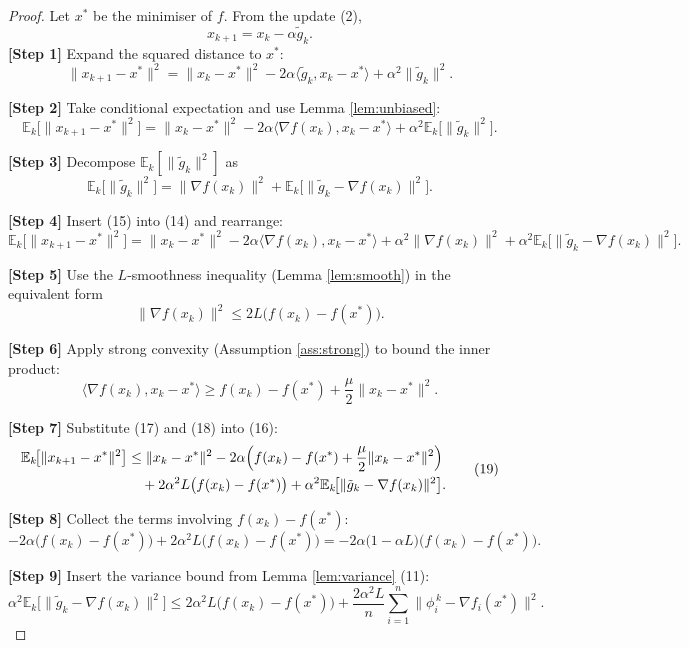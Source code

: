 \documentclass[11pt]{article}
\begin{document}
\begin{proof}
Let $x^*$ be the minimiser of $f$.  From the update (2),
\[
x_{k+1}=x_k-\alpha\tilde g_k .
\tag{12}
\]
\textbf{[Step 1]} Expand the squared distance to $x^*$:
\[
\|x_{k+1}-x^*\|^2
= \|x_k-x^*\|^2-2\alpha\langle\tilde g_k,x_k-x^*\rangle+\alpha^2\|\tilde g_k\|^2 .
\tag{13}
\]

\textbf{[Step 2]} Take conditional expectation and use Lemma \ref{lem:unbiased}:
\[
\mathbb{E}_k\bigl[\|x_{k+1}-x^*\|^2\bigr]
= \|x_k-x^*\|^2-2\alpha\langle\nabla f(x_k),x_k-x^*\rangle
   +\alpha^2\mathbb{E}_k\!\bigl[\|\tilde g_k\|^2\bigr].
\tag{14}
\]

\textbf{[Step 3]} Decompose $\mathbb{E}_k[\|\tilde g_k\|^2]$ as
\[
\mathbb{E}_k\!\bigl[\|\tilde g_k\|^2\bigr]
= \|\nabla f(x_k)\|^2
   +\mathbb{E}_k\!\bigl[\|\tilde g_k-\nabla f(x_k)\|^2\bigr] .
\tag{15}
\]

\textbf{[Step 4]} Insert (15) into (14) and rearrange:
\[
\mathbb{E}_k\!\bigl[\|x_{k+1}-x^*\|^2\bigr]
= \|x_k-x^*\|^2-2\alpha\langle\nabla f(x_k),x_k-x^*\rangle
   +\alpha^2\|\nabla f(x_k)\|^2
   +\alpha^2\mathbb{E}_k\!\bigl[\|\tilde g_k-\nabla f(x_k)\|^2\bigr].
\tag{16}
\]

\textbf{[Step 5]} Use the $L$‑smoothness inequality (Lemma \ref{lem:smooth}) in the equivalent form
\[
\|\nabla f(x_k)\|^2\le 2L\bigl(f(x_k)-f(x^*)\bigr) .
\tag{17}
\]

\textbf{[Step 6]} Apply strong convexity (Assumption \ref{ass:strong}) to bound the inner product:
\[
\langle\nabla f(x_k),x_k-x^*\rangle
\ge f(x_k)-f(x^*)+\frac{\mu}{2}\|x_k-x^*\|^2 .
\tag{18}
\]

\textbf{[Step 7]} Substitute (17) and (18) into (16):
\[
\begin{aligned}
\mathbb{E}_k\!\bigl[\|x_{k+1}-x^*\|^2\bigr]
&\le \|x_k-x^*\|^2
    -2\alpha\Bigl(f(x_k)-f(x^*)+\frac{\mu}{2}\|x_k-x^*\|^2\Bigr)  \\
&\quad +2\alpha^2 L\bigl(f(x_k)-f(x^*)\bigr)
   +\alpha^2\mathbb{E}_k\!\bigl[\|\tilde g_k-\nabla f(x_k)\|^2\bigr].
\end{aligned}
\tag{19}
\]

\textbf{[Step 8]} Collect the terms involving $f(x_k)-f(x^*)$:
\[
-2\alpha\bigl(f(x_k)-f(x^*)\bigr)+2\alpha^2 L\bigl(f(x_k)-f(x^*)\bigr)
= -2\alpha\bigl(1-\alpha L\bigr)\bigl(f(x_k)-f(x^*)\bigr).
\tag{20}
\]

\textbf{[Step 9]} Insert the variance bound from Lemma \ref{lem:variance} (11):
\[
\alpha^2\mathbb{E}_k\!\bigl[\|\tilde g_k-\nabla f(x_k)\|^2\bigr]
\le 2\alpha^2L\bigl(f(x_k)-f(x^*)\bigr)
   +\frac{2\alpha^2 L}{n}\sum_{i=1}^{n}\|\phi_i^{\,k}-\nabla f_i(x^*)\|^2 .
\tag{21}
\]


\end{proof}
\end{document}
